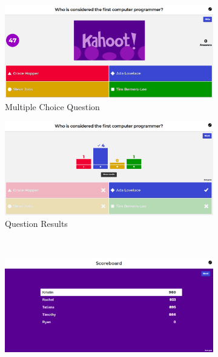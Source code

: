 \documentclass{article}
\begin{document}
        \begin{figure}[ht]
            \centering
            \begin{subfigure}[b]{0.49\textwidth}
                \includegraphics[width=\textwidth]{images/kahoot-question.png}
                \caption{Multiple Choice Question}
                \label{fig:kahoot-question}
            \end{subfigure}
            \begin{subfigure}[b]{0.49\textwidth}
                \includegraphics[width=\textwidth]{images/kahoot-post_question.png}
                \caption{Question Results}
                \label{fig:kahoot-post_question}
            \end{subfigure}
            \\
            \begin{subfigure}[b]{0.49\textwidth}
                \includegraphics[width=\textwidth]{images/kahoot-scoreboard.png}

\end{subfigure}
\end{figure}
\end{document}
